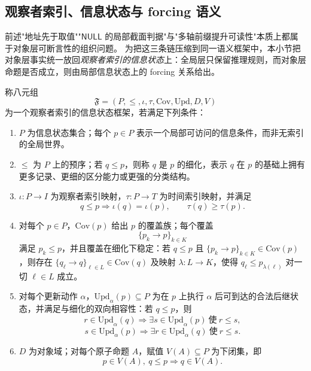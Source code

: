 \subsection{观察者索引、信息状态与 forcing 语义}\label{subsec:observer-indexed-forcing}
前述"地址先于取值""\(\mathsf{NULL}\) 的局部截面判据"与"多轴前缀提升可读性"本质上都属于对象层可断言性的组织问题。
为把这三条链压缩到同一语义框架中，本小节把对象层事实统一放回\emph{观察者索引的信息状态}上：全局层只保留推理规则，而对象层命题是否成立，则由局部信息状态上的 forcing 关系给出。

\begin{definition}[观察者索引的信息状态框架]\label{def:observer-indexed-information-frame}
称八元组
\[
\mathfrak F=(P,\le,\iota,\tau,\mathrm{Cov},\mathrm{Upd},D,V)
\]
为一个观察者索引的信息状态框架，若满足下列条件：
\begin{enumerate}
  \item \(P\) 为信息状态集合；每个 \(p\in P\) 表示一个局部可访问的信息条件，而非无索引的全局世界。
  \item \(\le\) 为 \(P\) 上的预序；若 \(q\le p\)，则称 \(q\) 是 \(p\) 的细化，表示 \(q\) 在 \(p\) 的基础上拥有更多记录、更细的区分能力或更强的分类结构。
  \item \(\iota:P\to I\) 为观察者索引映射，\(\tau:P\to T\) 为时间索引映射，并满足
  \[
  q\le p \Longrightarrow \iota(q)=\iota(p),\qquad \tau(q)\ge \tau(p).
  \]
  \item 对每个 \(p\in P\)，\(\mathrm{Cov}(p)\) 给出 \(p\) 的覆盖族；每个覆盖
  \[
  \{p_k\to p\}_{k\in K}
  \]
  满足 \(p_k\le p\)，并且覆盖在细化下稳定：若 \(q\le p\) 且 \(\{p_k\to p\}_{k\in K}\in\mathrm{Cov}(p)\)，则存在 \(\{q_\ell\to q\}_{\ell\in L}\in\mathrm{Cov}(q)\) 及映射 \(\lambda:L\to K\)，使得 \(q_\ell\le p_{\lambda(\ell)}\) 对一切 \(\ell\in L\) 成立。
  \item 对每个更新动作 \(\alpha\)，\(\mathrm{Upd}_\alpha(p)\subseteq P\) 为在 \(p\) 上执行 \(\alpha\) 后可到达的合法后继状态，并满足与细化的双向相容性：若 \(q\le p\)，则
  \[
  r\in \mathrm{Upd}_\alpha(q)\Rightarrow \exists s\in \mathrm{Upd}_\alpha(p)\ \text{使}\ r\le s,
  \]
  \[
  s\in \mathrm{Upd}_\alpha(p)\Rightarrow \exists r\in \mathrm{Upd}_\alpha(q)\ \text{使}\ r\le s.
  \]
  \item \(D\) 为对象域；对每个原子命题 \(A\)，赋值 \(V(A)\subseteq P\) 为下闭集，即
  \[
  p\in V(A),\ q\le p \Longrightarrow q\in V(A).
  \]
\end{enumerate}
\end{definition}

